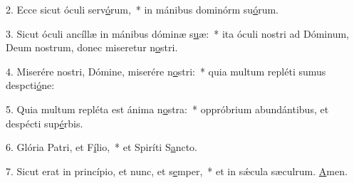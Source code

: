 2. Ecce sicut óculi serv\uline{ó}rum,~* in mánibus dominórm su\uline{ó}rum.\par 
3. Sicut óculi ancíllæ in mánibus dóminæ s\uline{u}æ:~* ita óculi nostri ad Dóminum, Deum nostrum, donec miseretur n\uline{o}stri.\par 
4. Miserére nostri, Dómine, miserére n\uline{o}stri:~* quia multum repléti sumus despcti\uline{ó}ne:\par 
5. Quia multum repléta est ánima n\uline{o}stra:~* oppróbrium abundántibus, et despécti sup\uline{é}rbis.\par 
6. Glória Patri, et F\uline{í}lio,~* et Spiríti S\uline{a}ncto.\par 
7. Sicut erat in princípio, et nunc, et s\uline{e}mper,~* et in sǽcula sæculrum. \uline{A}men.\par 
